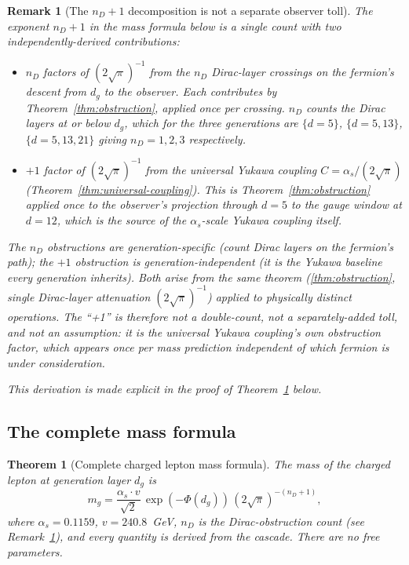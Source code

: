 \documentclass[12pt,a4paper]{article}
\newtheorem{theorem}{Theorem}[section]
\newtheorem*{remark}{Remark}
\begin{document}
\begin{remark}[The $n_D+1$ decomposition is not a separate observer toll]\label{rem:nd-plus-one}
The exponent $n_D + 1$ in the mass formula below is a single count with
two independently-derived contributions:
\begin{itemize}[nosep]
\item $n_D$ factors of $(2\sqrt{\pi})^{-1}$ from the $n_D$ Dirac-layer
crossings on the fermion's descent from $d_g$ to the observer. Each
contributes by Theorem~\ref{thm:obstruction}, applied once per
crossing. $n_D$ counts the Dirac layers at or below $d_g$, which for
the three generations are $\{d=5\}$, $\{d=5, 13\}$, $\{d=5, 13, 21\}$
giving $n_D = 1, 2, 3$ respectively.
\item $+1$ factor of $(2\sqrt{\pi})^{-1}$ from the universal Yukawa
coupling $C = \alpha_s/(2\sqrt{\pi})$
(Theorem~\ref{thm:universal-coupling}). This is Theorem~\ref{thm:obstruction}
applied once to the observer's projection through $d=5$ to the gauge
window at $d=12$, which is the source of the $\alpha_s$-scale Yukawa
coupling itself.
\end{itemize}
The $n_D$ obstructions are generation-specific (count Dirac layers on
the fermion's path); the $+1$ obstruction is generation-independent
(it is the Yukawa baseline every generation inherits). Both arise from
the same theorem (\ref{thm:obstruction}, single Dirac-layer attenuation
$(2\sqrt{\pi})^{-1}$) applied to physically distinct operations. The
``+1'' is therefore not a double-count, not a separately-added toll,
and not an assumption: it is the universal Yukawa coupling's own
obstruction factor, which appears once per mass prediction independent
of which fermion is under consideration.

This derivation is made explicit in the proof of
Theorem~\ref{thm:complete-mass} below.
\end{remark}

\subsection{The complete mass formula}

\begin{theorem}[Complete charged lepton mass formula]\label{thm:complete-mass}
The mass of the charged lepton at generation layer $d_g$ is
\[
m_g = \frac{\alpha_s \cdot v}{\sqrt{2}}\,\exp(-\Phi(d_g))\,(2\sqrt{\pi})^{-(n_D+1)},
\]
where $\alpha_s = 0.1159$, $v = 240.8$~GeV, $n_D$ is the Dirac-obstruction
count (see Remark~\ref{rem:nd-plus-one}), and every quantity is
derived from the cascade. There are no free parameters.
\end{theorem}
\end{document}
